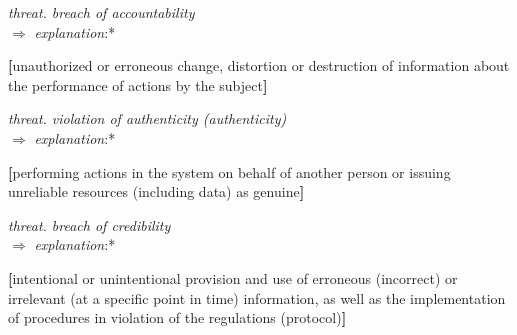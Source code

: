 \documentclass{article}
\begin{document}
\begin{multicols}{2}
\begin{description}[leftmargin=!, labelwidth=1cm, itemsep=-1.5mm]
\item[$\supset$] \vspace{-0.2cm} \textit {threat. breach of accountability} \\
\vspace{0.1cm} \hspace{-0.23cm}  $\Rightarrow$  \hspace{0.5cm} \textit{explanation}:* 
 \begin{description}[leftmargin=!, labelwidth=0.9cm, itemsep=-1.5mm]
   \item \vspace{-0.4cm}\textbf{[}unauthorized or erroneous change, distortion or destruction of information about
the performance of actions by the subject\textbf{]}
\end{description}

\item[$\supset$] \vspace{-0.1cm} \textit {threat. violation of authenticity (authenticity)} \\
\vspace{0.1cm} \hspace{-0.23cm}  $\Rightarrow$  \hspace{0.5cm} \textit{explanation}:* 
\begin{description}[leftmargin=!, labelwidth=0.9cm, itemsep=-1.5mm]
   \item \vspace{-0.4cm}\textbf{[}performing actions in the system on behalf
of another person or issuing unreliable
resources (including data) as genuine\textbf{]}
\end{description}

\item[$\supset$] \vspace{-0.1cm} \textit {threat. breach of credibility
} \\
\vspace{0.1cm} \hspace{-0.23cm}  $\Rightarrow$  \hspace{0.5cm} \textit{explanation}:*
\begin{description}[leftmargin=!, labelwidth=0.9cm, itemsep=-1.5mm]
   \item \vspace{-0.4cm}\textbf{[}intentional or unintentional provision and
use of erroneous (incorrect) or irrelevant
(at a specific point in time) information, as
well as the implementation of procedures
in violation of the regulations (protocol)\textbf{]}
\end{description}
\end{description}


\end{multicols}
\end{document}
